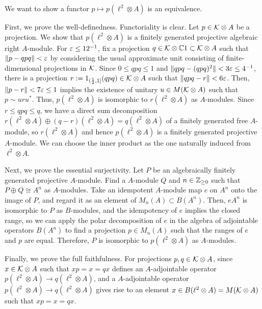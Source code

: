 \documentclass{../../large}
\begin{document}
\begin{prb}
We want to show a functor $p\mapsto p(\ell^2\otimes A)$ is an equivalence.

First, we prove the well-definedness.
Functoriality is clear.
Let $p\in\mathcal{K}\otimes A$ be a projection.
We show that $p(\ell^2\otimes A)$ is a finitely generated projective algebraic right $A$-module.
For $\varepsilon\le12^{-1}$, fix a projection $q\in\mathcal{K}\otimes\mathbb{C}1\subset\mathcal{K}\otimes A$ such that $\|p-qpq\|<\varepsilon$ by considering the usual approximate unit consisting of finite-dimensional projections in $\mathcal{K}$.
Since $0\le qpq\le1$ and $\|qpq-(qpq)^2\|<3\varepsilon\le4^{-1}$, there is a projection $r:=1_{(\frac12,1]}(qpq)\in\mathcal{K}\otimes A$ such that $\|qpq-r\|<6\varepsilon$.
Then, $\|p-r\|<7\varepsilon\le1$ implies the existence of unitary $u\in M(\mathcal{K}\otimes A)$ such that $p\sim uru^*$.
Thus, $p(\ell^2\otimes A)$ is isomorphic to $r(\ell^2\otimes A)$ as $A$-modules.
Since $r\le qpq\le q$, we have a direct sum decomposition $r(\ell^2\otimes A)\oplus(q-r)(\ell^2\otimes A)=q(\ell^2\otimes A)$ of a finitely generated free $A$-module, so $r(\ell^2\otimes A)$ and hence $p(\ell^2\otimes A)$ is a finitely generated projective $A$-module.
We can choose the inner product as the one naturally induced from $\ell^2\otimes A$.

Next, we prove the essential surjectivity.
Let $P$ be an algebraically finitely generated projective $A$-module.
Find a $A$-module $Q$ and $n\in\mathbb{Z}_{\ge0}$ such that $P\oplus Q\cong A^n$ as $A$-modules.
Take an idempotent $A$-module map $e$ on $A^n$ onto the image of $P$, and regard it as an element of $M_n(A)\subset B(A^n)$.
Then, $eA^n$ is isomorphic to $P$ as $B$-modules, and the idempotency of $e$ implies the closed range, so we can apply the polar decomposition of $e$ in the algebra of adjointable operators $B(A^n)$ to find a projection $p\in M_n(A)$ such that the ranges of $e$ and $p$ are equal.
Therefore, $P$ is isomorphic to $p(\ell^2\otimes A)$ as $A$-modules.

Finally, we prove the full faithfulness.
For projections $p,q\in\mathcal{K}\otimes A$, since $x\in\mathcal{K}\otimes A$ such that $xp=x=qx$ defines an $A$-adjointable operator $p(\ell^2\otimes A)\to q(\ell^2\otimes A)$, and a $A$-adjointable operator $p(\ell^2\otimes A)\to q(\ell^2\otimes A)$ gives rise to an element $x\in B(\ell^2\otimes A)=M(\mathcal{K}\otimes A)$ such that $xp=x=qx$.
\end{prb}
\end{document}
